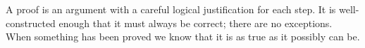 A proof is an argument with a careful logical justification for
each step.
It is well-constructed enough that it must always be correct;
there are no exceptions. When something has been proved we know that it is
as true as it possibly can be.